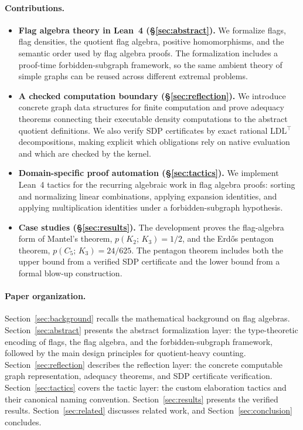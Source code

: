 \documentclass{article}
\newcommand{\tdensity}[2]{p(#1;\,#2)}
\begin{document}
\paragraph{Contributions.}
\begin{itemize}
  \item \textbf{Flag algebra theory in Lean~4 (\S\ref{sec:abstract}).}
    We formalize flags, flag densities, the quotient flag algebra, positive
    homomorphisms, and the semantic order used by flag algebra proofs.  The
    formalization includes a proof-time forbidden-subgraph framework, so the
    same ambient theory of simple graphs can be reused across different
    extremal problems.

  \item \textbf{A checked computation boundary (\S\ref{sec:reflection}).}
    We introduce concrete graph data structures for finite computation and
    prove adequacy theorems connecting their executable density computations
    to the abstract quotient definitions.  We also verify SDP certificates by
    exact rational LDL$^\top$ decompositions, making explicit which obligations
    rely on native evaluation and which are checked by the kernel.

  \item \textbf{Domain-specific proof automation (\S\ref{sec:tactics}).}
    We implement Lean~4 tactics for the recurring algebraic work in flag
    algebra proofs: sorting and normalizing linear combinations, applying
    expansion identities, and applying multiplication identities under a
    forbidden-subgraph hypothesis.

  \item \textbf{Case studies (\S\ref{sec:results}).}
    The development proves the flag-algebra form of Mantel's theorem,
    $\tdensity{K_2}{K_3}=1/2$, and the Erd\H{o}s pentagon theorem,
    $\tdensity{C_5}{K_3}=24/625$.  The pentagon theorem includes both the
    upper bound from a verified SDP certificate and the lower bound from a
    formal blow-up construction.
\end{itemize}

\paragraph{Paper organization.}
Section~\ref{sec:background} recalls the mathematical background on flag
algebras.
Section~\ref{sec:abstract} presents the abstract formalization layer:
the type-theoretic encoding of flags, the flag algebra, and the
forbidden-subgraph framework, followed by the main design principles for
quotient-heavy counting.
Section~\ref{sec:reflection} describes the reflection layer: the concrete
computable graph representation, adequacy theorems, and SDP certificate
verification.
Section~\ref{sec:tactics} covers the tactic layer: the custom elaboration
tactics and their canonical naming convention.
Section~\ref{sec:results} presents the verified results.
Section~\ref{sec:related} discusses related work, and
Section~\ref{sec:conclusion} concludes.
\end{document}
